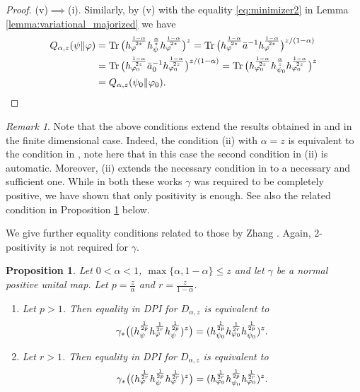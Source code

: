 \documentclass[12pt]{article}
\newtheorem{prop}[theorem]{Proposition}
\theoremstyle{definition}
\theoremstyle{remark}
\newtheorem{remark}[theorem]{Remark}
\numberwithin{equation}{section}
\def \Tr{\mathrm{Tr}\,}
\def\ffi{\varphi}
\begin{document}
\begin{proof}
(v)$\implies$(i).\enspace
Similarly, by (v) with the equality \eqref{eq:minimizer2} in Lemma
\ref{lemma:variational_majorized} we have
\begin{align*}
Q_{\alpha,z}(\psi\|\ffi)
&=\Tr\bigl(h_\ffi^{1-\alpha\over2z}h_\psi^{\alpha\over z}h_\ffi^{1-\alpha\over2z}\bigr)^z
=\Tr\bigl(h_\ffi^{1-\alpha\over2z}\bar a^{-1}h_\ffi^{1-\alpha\over2z}\bigr)^{z/(1-\alpha)} \\
&=\Tr\bigl(h_{\ffi_0}^{1-\alpha\over2z}\bar a_0^{-1}h_{\ffi_0}^{1-\alpha\over2z}\bigr)^{z/(1-\alpha)}
=\Tr\bigl(h_{\ffi_0}^{1-\alpha\over2z}h_{\psi_0}^{\alpha\over z}h_{\ffi_0}^{1-\alpha\over2z}\bigr)^z \\
&=Q_{\alpha,z}(\psi_0\|\ffi_0).
\end{align*}
\end{proof}


\begin{remark}\label{rem:conditions} Note that the above conditions extend the results
obtained in \cite{leditzky2017data} and \cite{zhang2020equality} in
the finite dimensional case.
Indeed, the condition (ii) with $\alpha=z$ is equivalent to the condition in \cite[Thm.
1]{laditzky2017data}, note here that in this case the second condition in (ii) is
automatic. Moreover, (ii) extends the necessary condition in \cite[Thm. 1.2
(2)]{zhang2020equality} to a necessary and sufficient one. While in both these
 works $\gamma$ was required to be completely positive, we have shown that only
positivity is enough. See also the related condition in Proposition
\ref{prop:DPI_equality2} below.

\end{remark}


We give further equality conditions related to those by Zhang \cite[Thm.
1.2]{zhang2020equality}. Again, 2-positivity is not required for $\gamma$. 



\begin{prop}\label{prop:DPI_equality2} Let $0<\alpha<1$, $\max\{\alpha,1-\alpha\}\le z$ and let
$\gamma$ be a normal positive unital map. Let $p=\frac{z}{\alpha}$ and
$r=\frac{z}{1-\alpha}$. 
\begin{enumerate}
\item[(i)]  Let $p>1$. Then equality in DPI for $D_{\alpha,z}$ is equivalent to
\[
\gamma_*\bigl((h_\psi^{1\over 2p}h_\ffi^{1\over 2r}h_\psi^{1\over
2p})^{z}\bigr)=(h_{\psi_0}^{1\over 2p}h_{\ffi_0}^{1\over 2r}h_{\psi_0}^{1\over
2p})^{z}.
\]
\item[(ii)] Let $r>1$. Then equality in DPI for $D_{\alpha,z}$ is equivalent to
\[
\gamma_*\bigl((h_\ffi^{1\over 2r}h_\psi^{1\over 2p}h_\ffi^{1\over
2r})^{z}\bigr)=(h_{\ffi_0}^{1\over 2r}h_{\psi_0}^{1\over 2p}h_{\ffi_0}^{1\over 2r})^{z}.
\]

\end{enumerate}


\end{prop}
\end{document}
